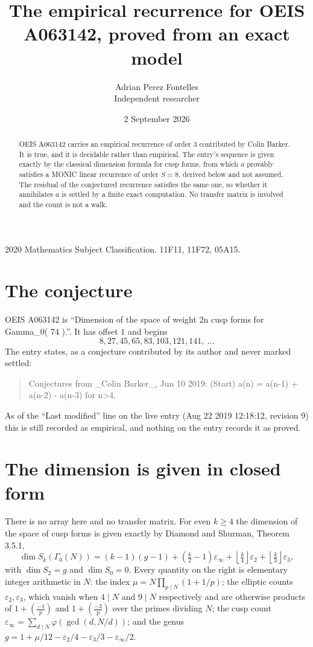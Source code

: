 \documentclass[11pt,a4paper]{article}
\title{The empirical recurrence for OEIS A063142, proved from an exact model}
\author{Adrian Perez Fontelles\\ \small Independent researcher}
\date{2 September 2026}
\theoremstyle{plain}
\theoremstyle{definition}
\begin{document}
\maketitle

\begin{abstract}
OEIS A063142 carries an empirical recurrence of order $3$ contributed by Colin Barker. It is true, and it is
decidable rather than empirical. The entry's sequence is given exactly by the classical dimension formula for cusp forms, from
which $a$ provably satisfies a MONIC linear recurrence of order $S=8$, derived below and not
assumed. The residual of the conjectured recurrence satisfies the same one, so whether it
annihilates $a$ is settled by a finite exact computation. No transfer matrix is involved and
the count is not a walk.
\end{abstract}

\noindent\small 2020 Mathematics Subject Classification. 11F11, 11F72, 05A15.\normalsize

\section{The conjecture}

OEIS A063142 is ``Dimension of the space of weight 2n cusp forms for Gamma\_0( 74 ).''. It has offset $1$ and begins
\[
8, 27, 45, 65, 83, 103, 121, 141,\ \dots
\]
The entry states, as a conjecture contributed by its author and never marked settled:
\begin{quote}
Conjectures from \_Colin Barker\_, Jun 10 2019: (Start) a(n) = a(n-1) + a(n-2) - a(n-3) for n>4.
\end{quote}
As of the ``Last modified'' line on the live entry (Aug 22 2019 12:18:12, revision 9)
this is still recorded as empirical, and nothing on the entry records it as proved.

\section{The dimension is given in closed form}

There is no array here and no transfer matrix. For even $k\ge4$ the dimension of the space of
cusp forms is given exactly by Diamond and Shurman, Theorem 3.5.1,
\[
\dim S_k(\Gamma_0(N))=(k-1)(g-1)+\left(\tfrac{k}{2}-1\right)\varepsilon_\infty
+\left\lfloor\tfrac{k}{4}\right\rfloor\varepsilon_2
+\left\lfloor\tfrac{k}{3}\right\rfloor\varepsilon_3 ,
\]
with $\dim S_2=g$ and $\dim S_0=0$. Every quantity on the right is elementary integer
arithmetic in $N$: the index $\mu=N\prod_{p\mid N}(1+1/p)$; the elliptic counts
$\varepsilon_2,\varepsilon_3$, which vanish when $4\mid N$ and $9\mid N$ respectively and are
otherwise products of $1+\left(\frac{-1}{p}\right)$ and $1+\left(\frac{-3}{p}\right)$
over the primes dividing $N$; the cusp count
$\varepsilon_\infty=\sum_{d\mid N}\varphi(\gcd(d,N/d))$; and the genus
$g=1+\mu/12-\varepsilon_2/4-\varepsilon_3/3-\varepsilon_\infty/2$.
\end{document}
